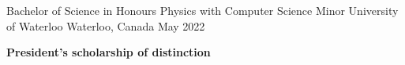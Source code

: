 
\begin{cventries}
  \cventry
    {Bachelor of Science in Honours Physics with Computer Science Minor} %
    {University of Waterloo} %
    {Waterloo, Canada} %
    {May 2022} %
    {
      \begin{cvitems} %
         \item {\textbf{President's scholarship of distinction}}
      \end{cvitems}
    }
\end{cventries}
